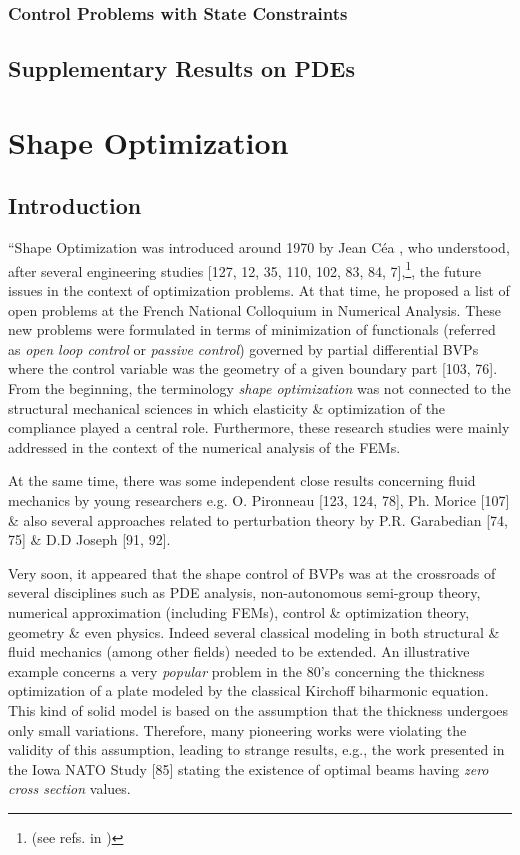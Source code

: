 \documentclass[oneside]{book}
\numberwithin{equation}{section}
\begin{document}
\subsection{Control Problems with State Constraints}

\section{Supplementary Results on PDEs}


\chapter{Shape Optimization}

\section{Introduction}
``Shape Optimization was introduced around 1970 by Jean C\'ea \cite{Cea_Gioan_Michel1973}, who understood, after several engineering studies [127, 12, 35, 110, 102, 83, 84, 7],\footnote{(see refs. in \cite{Moubachir_Zolesio2006})}, the future issues in the context of optimization problems. At that time, he proposed a list of open problems at the French National Colloquium in Numerical Analysis. These new problems were formulated in terms of minimization of functionals (referred as \textit{open loop control} or \textit{passive control}) governed by partial differential BVPs where the control variable was the geometry of a given boundary part [103, 76]. From the beginning, the terminology \textit{shape optimization} was not connected to the structural mechanical sciences in which elasticity \& optimization of the compliance played a central role. Furthermore, these research studies were mainly addressed in the context of the numerical analysis of the FEMs.

At the same time, there was some independent close results concerning fluid mechanics by young researchers e.g. O. Pironneau [123, 124, 78], Ph. Morice [107] \& also several approaches related to perturbation theory by P.R. Garabedian [74, 75] \& D.D Joseph [91, 92].

Very soon, it appeared that the shape control of BVPs was at the crossroads of several disciplines such as PDE analysis, non-autonomous semi-group theory, numerical approximation (including FEMs), control \& optimization theory, geometry \& even physics. Indeed several classical modeling in both structural \& fluid mechanics (among other fields) needed to be extended. An illustrative example concerns a very \textit{popular} problem in the 80's concerning the thickness optimization of a plate modeled by the classical Kirchoff biharmonic equation. This kind of solid model is based on the assumption that the thickness undergoes only small variations. Therefore, many pioneering works were violating the validity of this assumption, leading to strange results, e.g., the work presented in the Iowa NATO Study [85] stating the existence of optimal beams having \textit{zero cross section} values.
\end{document}
